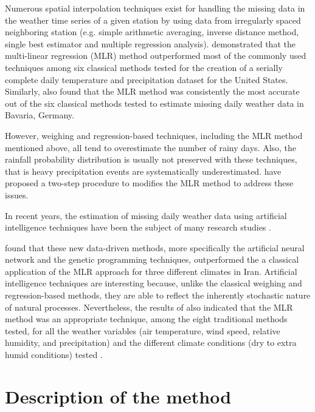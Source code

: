 \documentclass[WHATMANUAL.tex]{subfiles}
\begin{document}
Numerous spatial interpolation techniques exist for handling the missing data in the weather time series of a given station by using data from irregularly spaced neighboring station (e.g. simple arithmetic averaging, inverse distance method, single best estimator and multiple regression analysis). \cite{eischeid_creating_2000} demonstrated that the multi-linear regression (MLR) method \citep{degaetano_method_1995} outperformed most of the commonly used techniques among six classical methods tested for the creation of a serially complete daily temperature and precipitation dataset for the United States. Similarly, \cite{xia_forest_1999} also found that the MLR method was consistently the most accurate out of the six classical methods tested to estimate missing daily weather data in Bavaria, Germany.

However, weighing and regression-based techniques, including the MLR method mentioned above, all tend to overestimate the number of rainy days. Also, the rainfall probability distribution is usually not preserved with these techniques, that is heavy precipitation events are systematically underestimated. \cite{simolo_improving_2010} have proposed a two-step procedure to modifies the MLR method to address these issues.

In recent years, the estimation of missing daily weather data using artificial intelligence techniques have been the subject of many research studies \cite{kashani_evaluation_2011,kim_spatial_2008,srikanthan_comparison_2005,coulibaly_comparison_2007,abebe_application_2000,teegavarapu_improved_2005}.

\cite{kashani_evaluation_2011} found that these new data-driven methods, more specifically the artificial neural network and the genetic programming techniques, outperformed the a classical application of the MLR approach for three different climates in Iran. Artificial intelligence techniques are interesting because, unlike the classical weighing and regression-based methods, they are able to reflect the inherently stochastic nature of natural processes. Nevertheless, the results of \cite{kashani_evaluation_2011} also indicated that the MLR method was an appropriate technique, among the eight traditional methods tested, for all the weather variables (air temperature, wind speed, relative humidity, and precipitation) and the different climate conditions (dry to extra humid conditions) tested \citep{kashani_evaluation_2011}.

\section{Description of the method}
\end{document}
